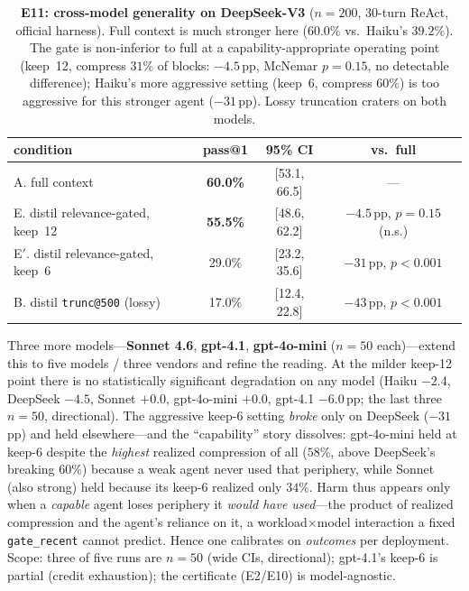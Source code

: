 \documentclass{article}
\begin{document}
\begin{table}[h]
\centering\small
\begin{tabular}{@{}l c c c@{}}
\toprule
condition & pass@1 & 95\% CI & vs.\ full \\
\midrule
A. full context & \textbf{60.0\%} & [53.1, 66.5] & --- \\
E. distil relevance-gated, keep~12 & \textbf{55.5\%} & [48.6, 62.2] & $-4.5$\,pp, $p{=}0.15$ (n.s.) \\
E$'$. distil relevance-gated, keep~6 & 29.0\% & [23.2, 35.6] & $-31$\,pp, $p{<}0.001$ \\
B. distil \texttt{trunc@500} (lossy) & 17.0\% & [12.4, 22.8] & $-43$\,pp, $p{<}0.001$ \\
\bottomrule
\end{tabular}
\caption{\textbf{E11: cross-model generality on DeepSeek-V3} ($n{=}200$, 30-turn ReAct,
official harness). Full context is much stronger here ($60.0\%$ vs.\ Haiku's $39.2\%$). The
gate is non-inferior to full at a capability-appropriate operating point (keep~12, compress
$31\%$ of blocks: $-4.5$\,pp, McNemar $p{=}0.15$, no detectable difference); Haiku's more
aggressive setting (keep~6, compress $60\%$) is too aggressive for this stronger agent
($-31$\,pp). Lossy truncation craters on both models.}
\label{tab:e11}
\end{table}

Three more models---\textbf{Sonnet 4.6}, \textbf{gpt-4.1}, \textbf{gpt-4o-mini} ($n{=}50$
each)---extend this to five models / three vendors and refine the reading. At the milder
keep-12 point there is no statistically significant degradation on any model (Haiku $-2.4$,
DeepSeek $-4.5$, Sonnet $+0.0$, gpt-4o-mini $+0.0$, gpt-4.1 $-6.0$\,pp; the last three $n{=}50$,
directional). The aggressive keep-6 setting \emph{broke} only on DeepSeek ($-31$\,pp) and held
elsewhere---and the ``capability'' story dissolves: gpt-4o-mini held at keep-6 despite the
\emph{highest} realized compression of all ($58\%$, above DeepSeek's breaking $60\%$) because a
weak agent never used that periphery, while Sonnet (also strong) held because its keep-6
realized only $34\%$. Harm thus appears only when a \emph{capable} agent loses periphery it
\emph{would have used}---the product of realized compression and the agent's reliance on it, a
workload$\times$model interaction a fixed \texttt{gate\_recent} cannot predict. Hence one
calibrates on \emph{outcomes} per deployment. Scope: three of five runs are $n{=}50$ (wide CIs,
directional); gpt-4.1's keep-6 is partial (credit exhaustion); the certificate (E2/E10) is
model-agnostic.
\end{document}
